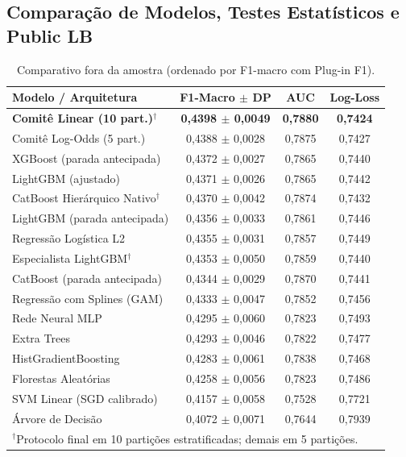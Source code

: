 \documentclass[10pt, conference, compsocconf]{IEEEtran}
\begin{document}
\subsection{Comparação de Modelos, Testes Estatísticos e Public LB}
\begin{table}[!t]
\centering
\caption{Comparativo fora da amostra (ordenado por F1-macro com Plug-in F1).}
\label{tab:modelos}
\scriptsize
\setlength{\tabcolsep}{2.5pt}
\begin{tabular}{@{}lccc@{}}
\toprule
\textbf{Modelo / Arquitetura} & \textbf{F1-Macro $\pm$ DP} & \textbf{AUC} & \textbf{Log-Loss} \\
\midrule
\textbf{Comitê Linear (10 part.)$^\dagger$} & \textbf{0,4398 $\pm$ 0,0049} & \textbf{0,7880} & \textbf{0,7424} \\
Comitê Log-Odds (5 part.) & 0,4388 $\pm$ 0,0028 & 0,7875 & 0,7427 \\
XGBoost (parada antecipada) & 0,4372 $\pm$ 0,0027 & 0,7865 & 0,7440 \\
LightGBM (ajustado) & 0,4371 $\pm$ 0,0026 & 0,7865 & 0,7442 \\
CatBoost Hierárquico Nativo$^\dagger$ & 0,4370 $\pm$ 0,0042 & 0,7874 & 0,7432 \\
LightGBM (parada antecipada) & 0,4356 $\pm$ 0,0033 & 0,7861 & 0,7446 \\
Regressão Logística L2 & 0,4355 $\pm$ 0,0031 & 0,7857 & 0,7449 \\
Especialista LightGBM$^\dagger$ & 0,4353 $\pm$ 0,0050 & 0,7859 & 0,7440 \\
CatBoost (parada antecipada) & 0,4344 $\pm$ 0,0029 & 0,7870 & 0,7441 \\
Regressão com Splines (GAM) & 0,4333 $\pm$ 0,0047 & 0,7852 & 0,7456 \\
Rede Neural MLP & 0,4295 $\pm$ 0,0060 & 0,7823 & 0,7493 \\
Extra Trees & 0,4293 $\pm$ 0,0046 & 0,7822 & 0,7477 \\
HistGradientBoosting & 0,4283 $\pm$ 0,0061 & 0,7838 & 0,7468 \\
Florestas Aleatórias & 0,4258 $\pm$ 0,0056 & 0,7823 & 0,7486 \\
SVM Linear (SGD calibrado) & 0,4157 $\pm$ 0,0058 & 0,7528 & 0,7721 \\
Árvore de Decisão & 0,4072 $\pm$ 0,0071 & 0,7644 & 0,7939 \\
\bottomrule
\multicolumn{4}{l}{\scriptsize $^\dagger$Protocolo final em 10 partições estratificadas; demais em 5 partições.}
\end{tabular}
\end{table}
\end{document}

